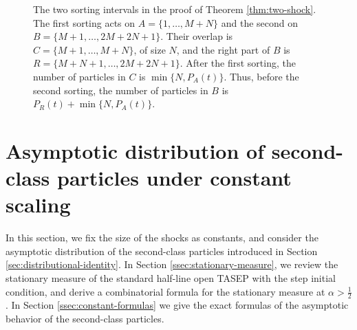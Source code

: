 \documentclass[12pt,a4paper]{amsart}
\theoremstyle{remark}
\numberwithin{equation}{section} \numberwithin{theorem}{section}
\begin{document}
\begin{figure}[t]
\centering
{}
\caption{The two sorting intervals in the proof of Theorem \ref{thm:two-shock}. 
The first sorting acts on $A=\{1,\ldots,M+N\}$ and the second on $B=\{M+1,\ldots,2M+2N+1\}$. 
Their overlap is $C=\{M+1,\ldots,M+N\}$, of size $N$, and the right part of $B$ is $R=\{M+N+1,\ldots,2M+2N+1\}$. 
After the first sorting, the number of particles in $C$ is $\min\{N,P_A(t)\}$. 
Thus, before the second sorting, the number of particles in $B$ is $P_R(t)+\min\{N,P_A(t)\}$.}
\label{fig:two-shock-sorting}
\end{figure}


\section{Asymptotic distribution of second-class particles under constant scaling}
\label{sec:constant-scaling}
In this section, we fix the size of the shocks as constants, and consider the asymptotic  distribution of the second-class particles introduced in Section \ref{sec:distributional-identity}.  In Section \ref{ssec:stationary-measure}, we review the stationary measure  of the standard half-line open TASEP with the step initial condition, and derive a combinatorial formula for the  stationary measure at $\alpha > \frac{1}{2}$. In Section \ref{ssec:constant-formulas} we give the exact formulas of the asymptotic behavior of the second-class particles.
\end{document}
